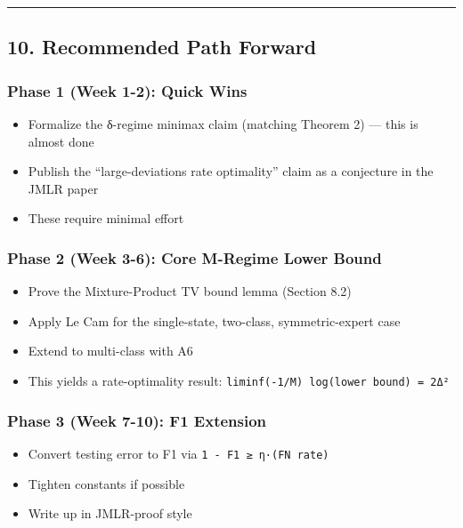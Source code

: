 \documentclass[
  12pt,
]{ctexart}
\providecommand{\tightlist}{%
  \setlength{\itemsep}{0pt}\setlength{\parskip}{0pt}}
\begin{document}
\begin{center}\rule{0.5\linewidth}{0.5pt}\end{center}

\subsection{10. Recommended Path
Forward}\label{recommended-path-forward}

\subsubsection{Phase 1 (Week 1-2): Quick
Wins}\label{phase-1-week-1-2-quick-wins}

\begin{itemize}
\tightlist
\item
  Formalize the δ-regime minimax claim (matching Theorem 2) --- this is
  almost done
\item
  Publish the ``large-deviations rate optimality'' claim as a conjecture
  in the JMLR paper
\item
  These require minimal effort
\end{itemize}

\subsubsection{Phase 2 (Week 3-6): Core M-Regime Lower
Bound}\label{phase-2-week-3-6-core-m-regime-lower-bound}

\begin{itemize}
\tightlist
\item
  Prove the Mixture-Product TV bound lemma (Section 8.2)
\item
  Apply Le Cam for the single-state, two-class, symmetric-expert case
\item
  Extend to multi-class with A6
\item
  This yields a rate-optimality result:
  \texttt{liminf(-1/M)\ log(lower\ bound)\ =\ 2Δ²}
\end{itemize}

\subsubsection{Phase 3 (Week 7-10): F1
Extension}\label{phase-3-week-7-10-f1-extension}

\begin{itemize}
\tightlist
\item
  Convert testing error to F1 via \texttt{1\ -\ F1\ ≥\ η·(FN\ rate)}
\item
  Tighten constants if possible
\item
  Write up in JMLR-proof style
\end{itemize}
\end{document}
